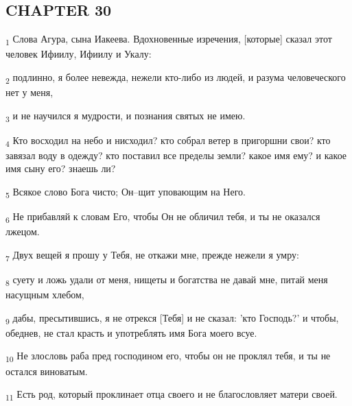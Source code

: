 \subsection{CHAPTER 30}
\begin{tcolorbox}
\textsubscript{1} Слова Агура, сына Иакеева. Вдохновенные изречения, [которые] сказал этот человек Ифиилу, Ифиилу и Укалу:
\end{tcolorbox}
\begin{tcolorbox}
\textsubscript{2} подлинно, я более невежда, нежели кто-либо из людей, и разума человеческого нет у меня,
\end{tcolorbox}
\begin{tcolorbox}
\textsubscript{3} и не научился я мудрости, и познания святых не имею.
\end{tcolorbox}
\begin{tcolorbox}
\textsubscript{4} Кто восходил на небо и нисходил? кто собрал ветер в пригоршни свои? кто завязал воду в одежду? кто поставил все пределы земли? какое имя ему? и какое имя сыну его? знаешь ли?
\end{tcolorbox}
\begin{tcolorbox}
\textsubscript{5} Всякое слово Бога чисто; Он--щит уповающим на Него.
\end{tcolorbox}
\begin{tcolorbox}
\textsubscript{6} Не прибавляй к словам Его, чтобы Он не обличил тебя, и ты не оказался лжецом.
\end{tcolorbox}
\begin{tcolorbox}
\textsubscript{7} Двух вещей я прошу у Тебя, не откажи мне, прежде нежели я умру:
\end{tcolorbox}
\begin{tcolorbox}
\textsubscript{8} суету и ложь удали от меня, нищеты и богатства не давай мне, питай меня насущным хлебом,
\end{tcolorbox}
\begin{tcolorbox}
\textsubscript{9} дабы, пресытившись, я не отрекся [Тебя] и не сказал: 'кто Господь?' и чтобы, обеднев, не стал красть и употреблять имя Бога моего всуе.
\end{tcolorbox}
\begin{tcolorbox}
\textsubscript{10} Не злословь раба пред господином его, чтобы он не проклял тебя, и ты не остался виноватым.
\end{tcolorbox}
\begin{tcolorbox}
\textsubscript{11} Есть род, который проклинает отца своего и не благословляет матери своей.
\end{tcolorbox}
